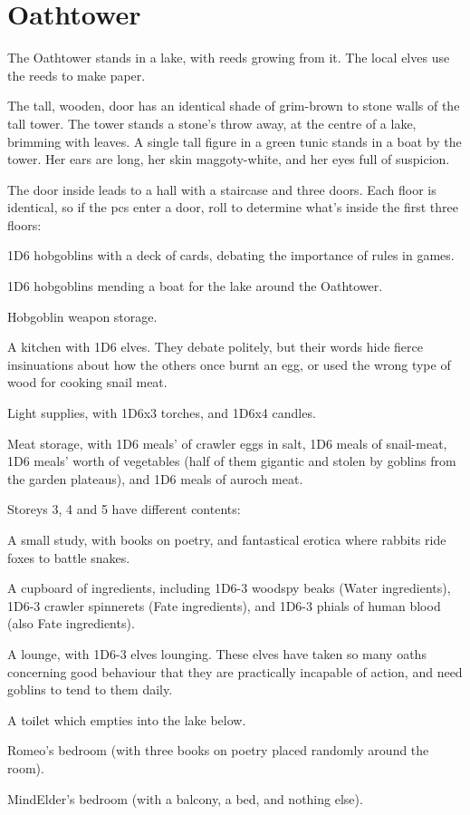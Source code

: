 \section{Oathtower}

The Oathtower stands in a lake, with reeds growing from it.
The local elves use the reeds to make paper.

\begin{boxtext}
  The tall, wooden, door has an identical shade of grim-brown to stone walls of the tall tower.
  The tower stands a stone's throw away, at the centre of a lake, brimming with leaves.
  A single tall figure in a green tunic stands in a boat by the tower.
  Her ears are long, her skin maggoty-white, and her eyes full of suspicion.
\end{boxtext}

The door inside leads to a hall with a staircase and three doors.
Each floor is identical, so if the \glspl{pc} enter a door, roll to determine what's inside the first three floors:

\begin{dlist}
  \item
  1D6 hobgoblins with a deck of cards, debating the importance of rules in games.
  \item
  1D6 hobgoblins mending a boat for the lake around the Oathtower.
  \item
  Hobgoblin weapon storage.
  \item
  A kitchen with 1D6 elves.  They debate politely, but their words hide fierce insinuations about how the others once burnt an egg, or used the wrong type of wood for cooking snail meat.
  \item
  Light supplies, with 1D6x3 torches, and 1D6x4 candles.
  \item
  Meat storage, with 1D6 meals' of \gls{crawler} eggs in salt, 1D6 meals of snail-meat, 1D6 meals' worth of vegetables (half of them gigantic and stolen by goblins from the garden plateaus), and 1D6 meals of auroch meat.
\end{dlist}

Storeys 3, 4 and 5 have different contents:

\begin{dlist}
  \item
  A small study, with books on poetry, and fantastical erotica where rabbits ride foxes to battle snakes.
  \item
  A cupboard of \glspl{ingredient}, including 1D6-3 woodspy beaks (Water \glspl{ingredient}), 1D6-3 \gls{crawler} spinnerets (Fate \glspl{ingredient}), and 1D6-3 phials of human blood (also Fate \glspl{ingredient}).
  \item
  A lounge, with 1D6-3 elves lounging.  These elves have taken so many oaths concerning good behaviour that they are practically incapable of action, and need goblins to tend to them daily.
  \item
  A toilet which empties into the lake below.
  \item
  Romeo's bedroom (with three books on poetry placed randomly around the room).
  \item
  \gls{MindElder}'s bedroom (with a balcony, a bed, and nothing else).
\end{dlist}

